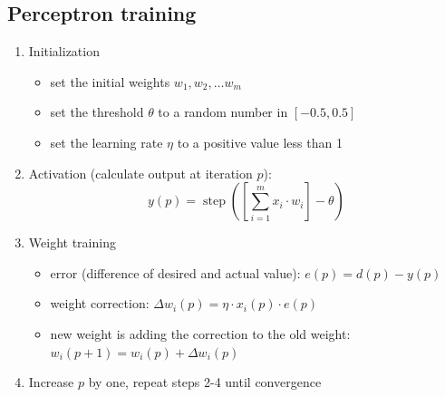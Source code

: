 \documentclass[a4paper,12pt,answers]{article}
\DeclareMathOperator*{\step}{step}
\newcommand{\stepfn}[1]{\step\left( #1 \right) }
\begin{document}
	
	
	\subsection{Perceptron training}
	
	\begin{enumerate}
		\item Initialization
		\begin{itemize}
			\item set the initial weights $w_1, w_2, \dots w_m$
			\item set the threshold $\theta$ to a random number in $\left[ -0.5, 0.5 \right] $
			\item set the learning rate $\eta$ to a positive value less than 1
		\end{itemize}
		\item Activation (calculate output at iteration $p$):
		\[
		y(p) = \stepfn{\left[ \sum_{i=1}^{m}{x_i \cdot w_i} \right] - \theta}
		\]
		\item Weight training
		\begin{itemize}
			\item error (difference of desired and actual value): $e(p) = d(p) - y(p) $
			\item weight correction: $\Delta w_i(p) = \eta \cdot x_i(p) \cdot e(p) $
			\item new weight is adding the correction to the old weight: $w_i(p+1) = w_i(p) + \Delta w_i(p)$
		\end{itemize}
		\item Increase $p$ by one, repeat steps 2-4 until convergence
	\end{enumerate}
	
\end{document}
